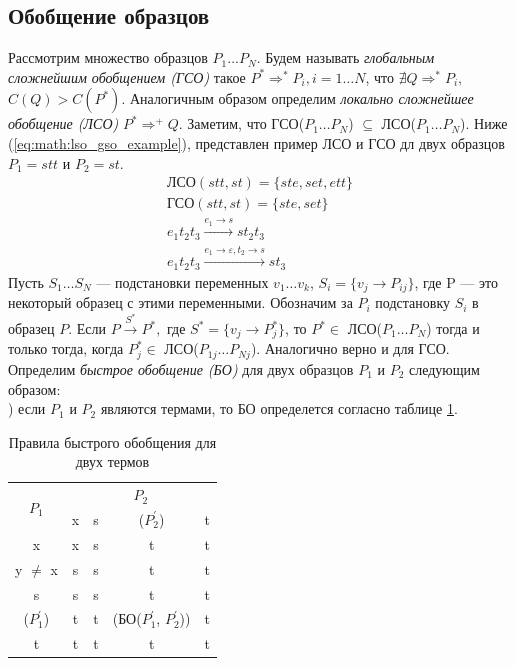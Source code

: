 \documentclass[12pt]{article}
\begin{document}
\subsection[Обобщение образцов]{\large Обобщение образцов}
\hspace{\parindent} Рассмотрим множество образцов $P_1 \ldots P_N$. Будем называть \textit{глобальным сложнейшим обобщением (ГСО)} такое $P^*\Rightarrow^*P_i, i = 1 \ldots N$, что $\nexists Q \Rightarrow^* P_i,$ $C(Q) > C(P^*)$. Аналогичным образом определим \textit{локально сложнейшее обобщение (ЛСО)} $P^*\Rightarrow^+ Q$. Заметим, что ГСО($P_1 \ldots P_N$) $\subseteq$ ЛСО($P_1 \ldots P_N$). Ниже (\ref{eq:math:lso_gso_example}), представлен пример ЛСО и ГСО дл двух образцов $P_1 = stt$ и $P_2 = st$.
\begin{equation}\label{eq:math:lso_gso_example}
\begin{array}{l}
\textrm{ЛСО}(stt, st) = \{ste, set, ett\} \\
\textrm{ГСО}(stt, st) = \{ste, set\} \\
e_1 t_2 t_3 \xrightarrow{e_1 \to s} s t_2 t_3 \\
e_1 t_2 t_3 \xrightarrow{e_1 \to \varepsilon, t_2 \to s} s t_3
\end{array}
\end{equation} 
\indent Пусть $S_1 \ldots S_N$ --- подстановки переменных $v_1 \ldots v_k$, $S_i = \{v_j \rightarrow P_{ij}\}$, где P --- это некоторый образец с этими переменными. Обозначим за $P_i$ подстановку $S_i$ в образец $P$. Если $P \xrightarrow{S^*} P^* ,$ где $S^* = \{v_j \rightarrow P^*_j\}$, то $P^* \in$ ЛСО($P_1 \ldots P_N$) тогда и только тогда, когда $P^*_j \in$ ЛСО($P_{1j} \ldots P_{Nj}$). Аналогично верно и для ГСО.\\
\indent Определим \textit{быстрое обобщение (БО)} для двух образцов $P_1$ и $P_2$ следующим образом:\\
) если $P_1$ и $P_2$ являются термами, то БО определется согласно таблице \ref{tab:bo}.
\begin{table}[h]
\caption{\label{tab:bo}Правила быстрого обобщения для двух термов}
\begin{center}
\begin{tabular}{|c|c|c|c|c|}
\hline
\multirow{2}{*}{$P_1$}   & \multicolumn{4}{c|}{$P_2$}                                                                                                 \\ \cline{2-5} 
                        & x & s & ($P_2^{'}$) & t \\ \hline
x & x & s & t & t \\ \hline
y $\neq$ x & s & s & t & t \\ \hline
s & s & s & t & t \\ \hline
($P_1^{'}$) & t & t & (БО($P_1^{'}$, $P_2^{'}$)) & t \\ \hline
t & t & t & t & t \\ \hline
\end{tabular}
\end{center}
\end{table}\\
\end{document}
